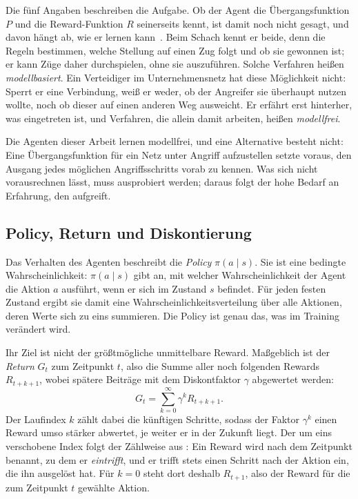 Die fünf Angaben beschreiben die Aufgabe. Ob der Agent die Übergangsfunktion $P$
und die Reward-Funktion $R$ seinerseits kennt, ist damit noch nicht gesagt, und
davon hängt ab, wie er lernen kann~\cite[Abschn.~1.3]{suttonbarto2018}. Beim Schach
kennt er beide, denn die Regeln bestimmen, welche Stellung auf einen Zug folgt
und ob sie gewonnen ist; er kann Züge daher durchspielen, ohne sie auszuführen.
Solche Verfahren heißen \emph{modellbasiert}. Ein Verteidiger im
Unternehmensnetz hat diese Möglichkeit nicht: Sperrt er eine Verbindung, weiß er
weder, ob der Angreifer sie überhaupt nutzen wollte, noch ob dieser auf einen
anderen Weg ausweicht. Er erfährt erst hinterher, was eingetreten ist, und
Verfahren, die allein damit arbeiten, heißen \emph{modellfrei}.

Die Agenten dieser Arbeit lernen modellfrei, und eine Alternative besteht nicht:
Eine Übergangsfunktion für ein Netz unter Angriff aufzustellen setzte voraus,
den Ausgang jedes möglichen Angriffsschritts vorab zu kennen. Was sich nicht
vorausrechnen lässt, muss ausprobiert werden; daraus folgt der hohe Bedarf an
Erfahrung, den  aufgreift.

\subsection{Policy, Return und Diskontierung}
\label{sec:policy}

Das Verhalten des Agenten beschreibt die \emph{Policy} $\pi(a \mid s)$. Sie ist
eine bedingte Wahrscheinlichkeit: $\pi(a \mid s)$ gibt an, mit welcher
Wahrscheinlichkeit der Agent die Aktion $a$ ausführt, wenn er sich im Zustand
$s$ befindet. Für jeden festen Zustand ergibt sie damit eine
Wahrscheinlichkeitsverteilung über alle Aktionen, deren Werte sich zu eins
summieren. Die Policy ist genau das, was im Training verändert wird.

Ihr Ziel ist nicht der größtmögliche unmittelbare Reward. Maßgeblich ist der
\emph{Return} $G_t$ zum Zeitpunkt $t$, also die Summe aller noch folgenden
Rewards $R_{t+k+1}$, wobei spätere Beiträge mit dem Diskontfaktor $\gamma$
abgewertet werden:
%
\begin{equation}
  G_t = \sum_{k=0}^{\infty} \gamma^{k} R_{t+k+1}.
  \label{eq:return}
\end{equation}
%
Der Laufindex $k$ zählt dabei die künftigen Schritte, sodass der Faktor
$\gamma^{k}$ einen Reward umso stärker abwertet, je weiter er in der Zukunft
liegt. Der um eins verschobene Index folgt der Zählweise aus
: Ein Reward wird nach dem Zeitpunkt benannt, zu dem
er \emph{eintrifft}, und er trifft stets einen Schritt nach der Aktion ein, die
ihn ausgelöst hat. Für $k = 0$ steht dort deshalb $R_{t+1}$, also der Reward
für die zum Zeitpunkt $t$ gewählte Aktion.

